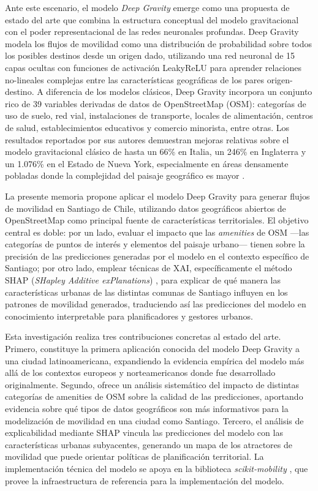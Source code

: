 Ante este escenario, el modelo \textit{Deep Gravity} \cite{simini2021deep} emerge como una propuesta de estado del arte que combina la estructura conceptual del modelo gravitacional con el poder representacional de las redes neuronales profundas. Deep Gravity modela los flujos de movilidad como una distribución de probabilidad sobre todos los posibles destinos desde un origen dado, utilizando una red neuronal de 15 capas ocultas con funciones de activación LeakyReLU para aprender relaciones no-lineales complejas entre las características geográficas de los pares origen-destino. A diferencia de los modelos clásicos, Deep Gravity incorpora un conjunto rico de 39 variables derivadas de datos de OpenStreetMap (OSM): categorías de uso de suelo, red vial, instalaciones de transporte, locales de alimentación, centros de salud, establecimientos educativos y comercio minorista, entre otras. Los resultados reportados por sus autores demuestran mejoras relativas sobre el modelo gravitacional clásico de hasta un 66\% en Italia, un 246\% en Inglaterra y un 1.076\% en el Estado de Nueva York, especialmente en áreas densamente pobladas donde la complejidad del paisaje geográfico es mayor \cite{simini2021deep}.

La presente memoria propone aplicar el modelo Deep Gravity para generar flujos de movilidad en Santiago de Chile, utilizando datos geográficos abiertos de OpenStreetMap como principal fuente de características territoriales. El objetivo central es doble: por un lado, evaluar el impacto que las \textit{amenities} de OSM —las categorías de puntos de interés y elementos del paisaje urbano— tienen sobre la precisión de las predicciones generadas por el modelo en el contexto específico de Santiago; por otro lado, emplear técnicas de XAI, específicamente el método SHAP (\textit{SHapley Additive exPlanations}) \cite{lundberg2017shap}, para explicar de qué manera las características urbanas de las distintas comunas de Santiago influyen en los patrones de movilidad generados, traduciendo así las predicciones del modelo en conocimiento interpretable para planificadores y gestores urbanos.

Esta investigación realiza tres contribuciones concretas al estado del arte. Primero, constituye la primera aplicación conocida del modelo Deep Gravity a una ciudad latinoamericana, expandiendo la evidencia empírica del modelo más allá de los contextos europeos y norteamericanos donde fue desarrollado originalmente. Segundo, ofrece un análisis sistemático del impacto de distintas categorías de amenities de OSM sobre la calidad de las predicciones, aportando evidencia sobre qué tipos de datos geográficos son más informativos para la modelización de movilidad en una ciudad como Santiago. Tercero, el análisis de explicabilidad mediante SHAP vincula las predicciones del modelo con las características urbanas subyacentes, generando un mapa de los atractores de movilidad que puede orientar políticas de planificación territorial. La implementación técnica del modelo se apoya en la biblioteca \textit{scikit-mobility} \cite{pappalardo2023scikitmobility}, que provee la infraestructura de referencia para la implementación del modelo.

